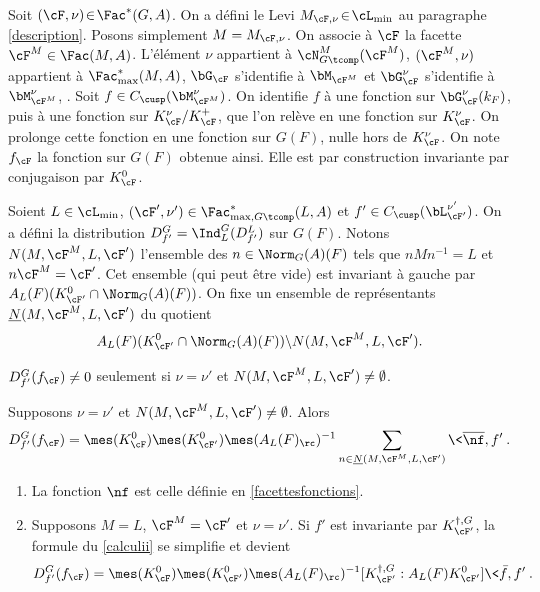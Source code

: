 Soit $(\cF,\nu)\!\in\!\Fac^*(G,A)$. On a défini le Levi \hbox{$M_{\cF,\nu}\!\in\!\cL_{\min}$} au paragraphe \ref{description}. Posons simplement $M=M_{\cF,\nu}$. On associe à $\cF$ la facette $\cF^{M}\in \Fac(M,A)$. L'élément $\nu$ appartient à $\cN_{G\tcomp}^M(\cF^{M})$, $(\cF^M,\nu)$ appartient à $\Fac^*_{\max}(M,A)$, $\bG_{\cF}$ s'identifie à $\bM_{\cF^M}$ et $\bG_{\cF}^{\nu}$ s'identifie à $\bM_{\cF^M}^{\nu}$, \cf \cite[Lem.\,6]{W2}. Soit $f\in C_{\cusp}(\bM^{\nu}_{\cF^M})$. On identifie $f$ à une fonction sur $\bG_{\cF}^{\nu}(k_{F})$, puis à une fonction sur $K_{\cF}^{\nu}/K_{\cF}^+$, que l'on relève en une fonction sur $K_{\cF}^{\nu}$. On prolonge cette fonction en une fonction sur $G(F)$, nulle hors de $K_{\cF}^{\nu}$. On note $f_{\cF}$ la fonction sur $G(F)$ obtenue ainsi. Elle est par construction invariante par conjugaison par $K_{\cF}^0$.

Soient $L\in \cL_{\min}$, $(\cF',\nu')\in \Fac^*_{\max,G\tcomp}(L,A)$ et $f'\in C_{\cusp}(\bL_{\cF'}^{\nu'})$. On a défini la distribution $D^G_{f'}=\Ind_{L}^G(D^L_{f'})$ sur $G(F)$. Notons $N(M,\cF^{M},L,\cF')$ l'ensemble des $n\in \Norm_{G}(A)(F)$ tels que $nMn^{-1}=L$ et $n\cF^{M}=\cF'$. Cet ensemble (qui peut être vide) est invariant à gauche par $A_{L}(F)(K_{\cF'}^0\cap \Norm_{G}(A)(F))$. On fixe un ensemble de représentants $\underline{N}(M,\cF^{M},L,\cF')$ du quotient
\[
A_{L}(F)(K_{\cF'}^0\cap \Norm_{G}(A)(F))\backslash N(M,\cF^{M},L,\cF').
\]

\skpt
\begin{prop*}
\begin{enumeratei}
\item\label{calculi}
$D^G_{f'}(f_{\cF})\neq0$ seulement si $\nu=\nu'$ et $N(M,\cF^{M},L,\cF')\neq\emptyset$.

\item\label{calculii}
Supposons $\nu=\nu'$ et $N(M,\cF^{M},L,\cF')\neq\emptyset$. Alors
\[
D^G_{f'}(f_{\cF})= \mes(K_{\cF}^0)\mes(K_{\cF'}^0) \mes(A_{L}(F)_{\rc})^{-1}\sum_{n\in \underline{N}(M,\cF^{M},L,\cF')}\<\overline{\nf},f'\>.
\]
\end{enumeratei}
\end{prop*}

\skpt
\begin{rems*}
\begin{enumerate}
\item\label{calcul1}
La fonction $\nf$ est celle définie en \ref{facettesfonctions}.

\item\label{calcul2}
Supposons $M=L$, $\cF^M=\cF'$ et $\nu=\nu'$. Si $f'$ est invariante par $K_{\cF'}^{\dag,G}$, la formule du \eqref{calculii} se simplifie et devient
\[
D_{f'}^G(f_{\cF})=\mes(K_{\cF}^0)\mes(K_{\cF'}^0)\mes(A_{L}(F)_{\rc})^{-1}[K_{\cF'}^{\dag,G}:A_{L}(F)K_{\cF'}^0]\<\bar{f},f'\>.
\]
\end{enumerate}
\end{rems*}

